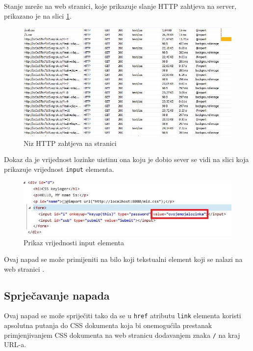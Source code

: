 \documentclass[12pt, oneside, onecolumn]{book}
\begin{document}
{Stanje mreže na web stranici, koje prikazuje slanje HTTP zahtjeva na server, prikazano je na slici \ref{fig:css_net}.

\begin{figure}[H]
	\begin{center}
		\includegraphics[width=\textwidth]{css_net.jpg}
		\caption{Niz HTTP zahtjeva na stranici} \label{fig:css_net}
	\end{center}
\end{figure}

Dokaz da je vrijednost lozinke uistinu ona koju je dobio sever se vidi na slici koja prikazuje vrijednost \texttt{input} elementa.

\begin{figure}[H]
	\begin{center}
		\includegraphics[width=\textwidth]{css_pv.jpg}
		\caption{Prikaz vrijednosti input elementa} \label{fig:css_pv}
	\end{center}
\end{figure}

Ovaj napad se može primijeniti na bilo koji tekstualni element koji se nalazi na web stranici \cite{cssnapad1}.

\pagebreak

\subsection{Sprječavanje napada}
Ovaj napad se može spriječiti tako da se u \texttt{href} atributu \texttt{link} elementa koristi apsolutna putanja do CSS dokumenta koja bi onemogućila prestanak primjenjivanjem CSS dokumenta na web stranicu dodavanjem znaka \texttt{/} na kraj URL-a.

}
\end{document}
